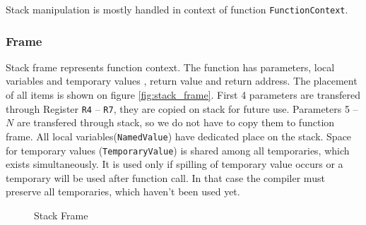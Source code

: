 \documentclass[12pt]{article}
\begin{document}
Stack manipulation is mostly handled in context of function \texttt{FunctionContext}.

\subsubsection{Frame}
Stack frame represents function context. The function has parameters, local variables and temporary values , return value and return address. The placement of all items is shown on figure \ref{fig:stack_frame}. First 4 parameters are transfered through Register \texttt{R4} -- \texttt{R7}, they are copied on stack for future use. Parameters 5 -- $N$ are transfered through stack, so we do not have to copy them to function frame. All local variables(\texttt{NamedValue}) have dedicated place on the stack. Space for temporary values (\texttt{TemporaryValue}) is shared among all temporaries, which exists simultaneously. It is used only if spilling of temporary value occurs or a temporary will be used after function call. In that case the compiler must preserve all temporaries, which haven't been used yet.

\begin{figure}[!h]
	\centering
	\caption{Stack Frame}
\end{figure}
\end{document}
